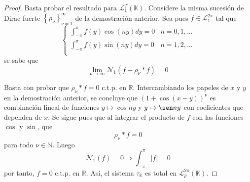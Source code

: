 \documentclass[12pt]{report}
\theoremstyle{largebreak}
\newcommand\abs[1]{\ensuremath{\big|#1\big|}}
\newcommand{\N}[2]{\ensuremath{\mathcal{N}_{#1}\left(#2\right)}}
\begin{document}
    \begin{proof}
        Basta probar el resultado para $\mathcal{L}_1^T(\mathbb{K})$. Considere la misma sucesión de Dirac fuerte $\left\{\rho_\nu \right\}_{\nu=1}^\infty$ de la demostración anterior. Sea pues $f\in\mathcal{L}_1^{2\pi}$ tal que
        \begin{equation*}
            \left\{
                \begin{array}{cr}
                    \int_{-\pi}^{\pi}f(y)\cos(ny)dy=0 & n=0,1,...\\
                    \int_{-\pi}^{\pi}f(y)\sin(ny)dy=0 & n=1,2,...\\
                \end{array}
            \right.
        \end{equation*}
        se sabe que
        \begin{equation*}
            \lim_{\nu\rightarrow\infty}\N{1}{f-\rho_\nu*f}=0
        \end{equation*}
    
        Basta con probar que $\rho_\nu*f=0$ c.t.p. en $\mathbb{R}$. Intercambiando los papeles de $x$ y $y$ en la demostración anterior, se concluye que $(1+\cos(x-y))^\nu$ es combinación lineal de funciones $y\mapsto\cos ny$ y $y\mapsto\sen ny$ con coeficientes que dependen de $x$. Se sigue pues que al integrar el producto de $f$ con las funciones $\cos$ y $\sin$, que
        \begin{equation*}
            \rho_\nu*f=0
        \end{equation*}
        para todo $\nu\in\mathbb{N}$. Luego
        \begin{equation*}
            \N{1}{f}=0\Rightarrow \int_{-\pi}^{\pi} \abs{f}=0
        \end{equation*}
        por tanto, $f=0$ c.t.p. en $\mathbb{R}$. Así, el sistema $\tau_{\mathbb{K}}$ es total en $\mathcal{L}_p^{2\pi}(\mathbb{K})$.
    \end{proof}
\end{document}
